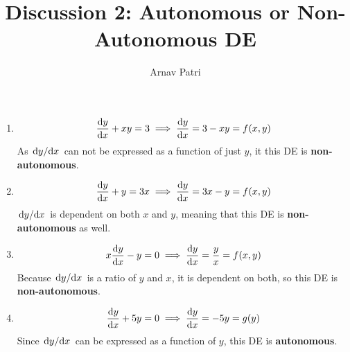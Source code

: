 \documentclass[A4, 12pt]{article}
\title{Discussion 2: Autonomous or Non-Autonomous DE}
\author{Arnav Patri}
\begin{document}
	\maketitle
		\begin{enumerate}[1)]
			\item
				\[
					\dv{y}{x} + xy = 3 
						\implies \dv{y}{x} = 3 - xy = f(x, y)
				\]
				As \(\dv*{y}{x}\) can not be expressed as a function of just \(y\), it this DE is \textbf{non-autonomous}.
			\item
				\[
					\dv{y}{x} + y = 3x
						\implies \dv{y}{x} = 3x - y = f(x, y)
				\]
				\(\dv*{y}{x}\) is dependent on both \(x\) and \(y\), meaning that this DE is \textbf{non-autonomous} as well.
			\item
				\[
					x\dv{y}{x} - y = 0
						\implies \dv{y}{x} = \frac{y}{x} = f(x, y)
				\]
				Because \(\dv*{y}{x}\) is a ratio of \(y\) and \(x\), it is dependent on both, so this DE is \textbf{non-autonomous}.
			\item
				\[
					\dv{y}{x} + 5y = 0
						\implies \dv{y}{x} = -5y = g(y)
				\]
				Since \(\dv*{y}{x}\) can be expressed as a function of \(y\), this DE is \textbf{autonomous}.
		\end{enumerate}
\end{document}
